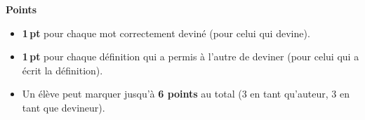 \vspace{20pt}
\textcolor{themeColor}{\textbf{\large Points}}

\begin{itemize}[leftmargin=*, label=$\diamond$]
\item \textbf{1\,pt} pour chaque mot correctement deviné (pour celui qui devine).
\item \textbf{1\,pt} pour chaque définition qui a permis à l'autre de deviner (pour celui qui a écrit la définition).
\item Un élève peut marquer jusqu'à \textbf{6 points} au total (3 en tant qu'auteur, 3 en tant que devineur).
\end{itemize}
%
%
